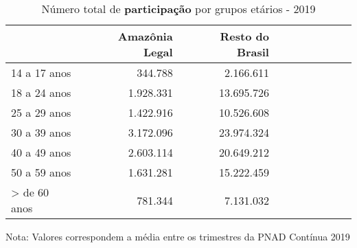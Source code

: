 \begin{table}[H]
\centering
\label{\_retrato\_emprego\_fotografia\_faixa\_etaria\_table\_participacao}
\begin{threeparttable}
\caption{Número total de \textbf{participação} por grupos etários - 2019}
\begin{tabular}{l*{3}{rrr}}
\midrule \midrule
                    &Amazônia Legal&Resto do Brasil\\
\midrule
14 a 17 anos        &     344.788&   2.166.611\\
18 a 24 anos        &   1.928.331&  13.695.726\\
25 a 29 anos        &   1.422.916&  10.526.608\\
30 a 39 anos        &   3.172.096&  23.974.324\\
40 a 49 anos        &   2.603.114&  20.649.212\\
50 a 59 anos        &   1.631.281&  15.222.459\\
> de 60 anos        &     781.344&   7.131.032\\
\bottomrule
\end{tabular}
\begin{tablenotes}
\scriptsize{Nota: Valores correspondem a média entre os trimestres da PNAD Contínua 2019}
\end{tablenotes}
\end{threeparttable}
\end{table}
